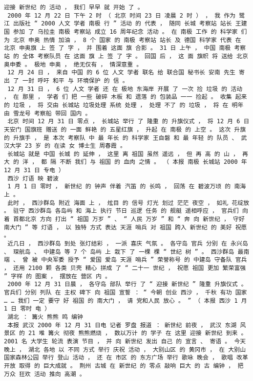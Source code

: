 \documentclass{article}
\begin{document}
\begin{Verbatim}[commandchars=\\\{\}]
 迎接 新世纪 的 活动 ， 我们 早早 就 开始 了 。 
 2000 年 12 月 22 日 下午 2 时 （ 北京 时间 23 日 凌晨 2 时 ） ， 我 作为 鹭江 出版社 “ 2000 人文 学者 南极 行 ” 活动 的 代表 ， 随同 长城 考察站 站长 王建国 参加 了 乌拉圭 南极 考察站 成立 16 周年纪念 活动 。 在 南极 工作 的 科学家 们 为 北京 申奥 热情 加油 ， 8 个 国家 的 南极 考察站 站长 及 德国 科学家 代表 在 北京 申奥旗 上 签 了 字 ， 并 围着 这面 旗 合影 。 31 日 上午 ， 中国 南极 考察站 的 全体 考察队员 在 这面 旗 上 签 了 字 。 回国 后 ， 这 面 旗帜 将 送给 北京 奥申委 。 极地 申奥 ， 绝无仅有 ， 情深意重 。 
 12 月 24 日 ， 来自 中国 的 6 位 人文 学者 联名 给 联合国 秘书长 安南 先生 寄出 了 一封 呼吁 和平 与 环境保护 的 信 。 
 12 月 31 日 ， 6 位 人文 学者 还 在 极地 东海岸 开展 了 一次 捡 垃圾 的 活动 ， 在 那里 ， 学者 们 把 一些 破碎 木板 和 遗落 的 包装品 一一 捡起 。 收集 起来 的 垃圾 ， 将 交由 长城站 垃圾处理 系统 处理 ， 处理 不了 的 垃圾 ， 将 在 明年 由 雪龙号 考察船 带回 国内 。 
 北京 时间 12 月 31 日 零点 ， 长城站 举行 了 隆重 的 升旗仪式 ， 将 12 月 6 日 天安门 国旗班 赠送 的 一面 鲜艳 的 五星红旗 ， 升起 在 南极 的 上空 。 这次 升旗 的 升旗手 ， 是 本次 考察队 中 最 年长 的 科学家 王自磐 和 最 年轻 的 队员 、 武汉大学 23 岁 的 在读 女 博士生 周春霞 。 
 长城站 就是 中国 长城 的 延伸 ， 这里 离 祖国 虽然 遥远 ， 但 再 高 的 山 ， 再 大 的 洋 ， 都 隔 不断 我们 与 祖国 的 血肉 之情 。 （ 本报 南极 长城站 2000 年 12 月 31 日 专电 ） 
 西沙 灯语 映 碧波 
 1 月 1 日 零时 ， 新世纪 的 钟声 伴着 汽笛 的 长鸣 ， 回荡 在 碧波万顷 的 南海 上 。 
 此时 ， 西沙群岛 附近 海面 上 ， 炫目 的 信号 灯光 划过 茫茫 夜空 ， 如礼 花绽放 。 驻守 西沙群岛 各岛屿 和 海上 执行 节日 巡逻 任务 的 舰艇 遥相呼应 ， 官兵们 向着 首都北京 方向 打出 “ 祖国 万岁 ” 、 “ 人民 万岁 ” 和 “ 奔 向 新世纪 ， 守好 南大门 ” 等 灯语 ， 以 独特 方式 表达 天涯 哨兵 对 祖国 跨入 新世纪 的 美好 祝愿 。 
 近几日 ， 西沙群岛 到处 张灯结彩 ， 一派 喜庆 气氛 。 各守岛 官兵 分别 在 永兴岛 、 琛航岛 、 中建岛 等 7 个 岛屿 上 栽下 了 一棵 棵 “ 世纪 树 ” 。 西沙群岛 最南端 、 曾 被 中央军委 授予 “ 爱国 爱岛 天涯 哨兵 ” 荣誉称号 的 中建岛 守备队 官兵 ， 还用 2100 颗 各类 贝壳 精心 拼成 了 “ 二十一 世纪 ， 祝愿 祖国 更加 繁荣富强 ” 字样 的 图案 ， 摆放在 营区 内 。 
 2000 年 12 月 31 日晨 ， 各守岛 部队 举行 了 “ 迎接 新世纪 ” 隆重 升旗仪式 。 官兵们 分别 列队 在 主权 碑下 向 祖国 宣誓 ： “ 今朝 创业 西沙 ， 千秋 有功 国家 … … 我们 一定 要守 好 祖国 的 南大门 ， 请 党和人民 放心 。 ” （ 本报 西沙 1 月 1 日 零时 电 ） 
 湖北 ： 篝火 熊熊 鸣 编钟 
 本报 武汉 2000 年 12 月 31 日电 记者 罗盘 报道 ： 新世纪 前夜 ， 武汉 东湖 风景区 的 21 堆 篝火 彻夜 熊熊燃烧 ， 数以万计 的 学子 在 这里 迎接 新世纪 到来 。 2001 名 大学生 轮流 表演 节目 ， 并 向 新世纪 发出 自己 的 宣言 、 寄语 。 今天 晚上 ， 湖北 各地 以 不同 方式 举行 庆祝 活动 ， 大别山区 的 黄冈市 ， 在 大别山 国家森林公园 举行 登山 活动 ， 还 在 市区 的 东方广场 举行 歌咏 晚会 ， 歌唱 改革开放 取得 的 巨大成就 。 荆州 古城 在 新世纪 的 零点 敲响 巨大 的 古 编钟 ， 把 万众 狂欢 活动 推向 高潮 。 

\end{Verbatim}
\end{document}
